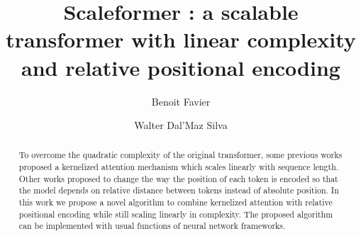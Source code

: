 \documentclass[lettersize,journal]{IEEEtran}
\begin{document}
\title{Scaleformer : a scalable transformer with linear complexity and relative positional encoding}

\author[1]{Benoit Favier}
\author[2]{Walter Dal'Maz Silva}


\maketitle

\begin{abstract}
To overcome the quadratic complexity of the original transformer, some previous works proposed a kernelized attention mechanism which scales linearly with sequence length. Other works proposed to change the way the position of each token is encoded so that the model depends on relative distance between tokens instead of absolute position. In this work we propose a novel algorithm to combine kernelized attention with relative positional encoding while still scaling linearly in complexity. The proposed algorithm can be implemented with usual functions of neural network frameworks.
\end{abstract}
















\end{document}
